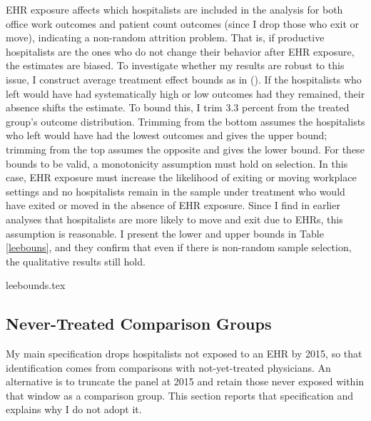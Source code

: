 \documentclass[12pt]{article}
\begin{document}
EHR exposure affects which hospitalists are included in the analysis for both office work outcomes and patient count outcomes (since I drop those who exit or move), indicating a non-random attrition problem. That is, if productive hospitalists are the ones who do not change their behavior after EHR exposure, the estimates are biased. To investigate whether my results are robust to this issue, I construct average treatment effect bounds as in  \citeauthor{lee2009training} (\citeyear{lee2009training}). If the hospitalists who left would have had systematically high or low outcomes had they remained, their absence shifts the estimate. To bound this, I trim 3.3 percent from the treated group's outcome distribution. Trimming from the bottom assumes the hospitalists who left would have had the lowest outcomes and gives the upper bound; trimming from the top assumes the opposite and gives the lower bound. For these bounds to be valid, a monotonicity assumption must hold on selection. In this case, EHR exposure must increase the likelihood of exiting or moving workplace settings and no hospitalists remain in the sample under treatment who would have exited or moved in the absence of EHR exposure. Since I find in earlier analyses that hospitalists are more likely to move and exit due to EHRs, this assumption is reasonable. I present the lower and upper bounds in Table \ref{leebouns}, and they confirm that even if there is non-random sample selection, the qualitative results still hold. 

{leebounds.tex}

\subsection{Never-Treated Comparison Groups}
\label{sec:nevertreated}

My main specification drops hospitalists not exposed to an EHR by 2015, so that identification comes from comparisons with not-yet-treated physicians. An alternative is to truncate the panel at 2015 and retain those never exposed
within that window as a comparison group. This section reports that specification and explains why I do not adopt it.
\end{document}
